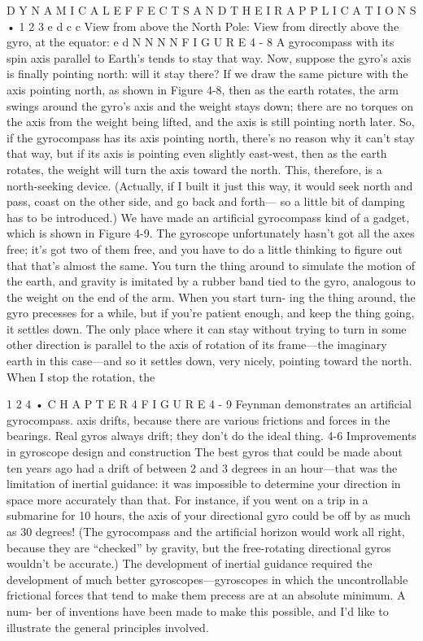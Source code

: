 \documentclass[10pt,oneside]{article}
\begin{document}
D Y N A M I C A L  E F F E C T S  A N D  T H E I R  A P P L I C A T I O N S • 1 2 3 e d c c View from above the North Pole: View from directly above the gyro, at the equator: e d N N N N F I G U R E  4 - 8 A gyrocompass with its spin axis parallel to Earth’s tends to stay that way. Now, suppose the gyro’s axis is finally pointing north: will it stay there? If we draw the same picture with the axis pointing north, as shown in Figure 4-8, then as the earth rotates, the arm swings around the gyro’s axis and the weight stays down; there are no torques on the axis from the weight being lifted, and the axis is still pointing north later. So, if the gyrocompass has its axis pointing north, there’s no reason why it can’t stay that way, but if its axis is pointing even slightly east-west, then as the earth rotates, the weight will turn the axis toward the north. This, therefore, is a north-seeking device. (Actually, if I built it just this way, it would seek north and pass, coast on the other side, and go back and forth--- so a little bit of damping has to be introduced.) We have made an artificial gyrocompass kind of a gadget, which is shown in Figure 4-9. The gyroscope unfortunately hasn’t got all the axes free; it’s got two of them free, and you have to do a little thinking to figure out that that’s almost the same. You turn the thing around to simulate the motion of the earth, and gravity is imitated by a rubber band tied to the gyro, analogous to the weight on the end of the arm. When you start turn- ing the thing around, the gyro precesses for a while, but if you’re patient enough, and keep the thing going, it settles down. The only place where it can stay without trying to turn in some other direction is parallel to the axis of rotation of its frame---the imaginary earth in this case---and so it settles down, very nicely, pointing toward the north. When I stop the rotation, the\par

1 2 4 • C H A P T E R  4 F I G U R E  4 - 9 Feynman demonstrates an artificial gyrocompass. axis drifts, because there are various frictions and forces in the bearings. Real gyros always drift; they don’t do the ideal thing. 4-6 Improvements in gyroscope design and construction The best gyros that could be made about ten years ago had a drift of between 2 and 3 degrees in an hour---that was the limitation of inertial guidance: it was impossible to determine your direction in space more accurately than that. For instance, if you went on a trip in a submarine for 10 hours, the axis of your directional gyro could be off by as much as 30 degrees! (The gyrocompass and the artificial horizon would work all right, because they are “checked” by gravity, but the free-rotating directional gyros wouldn’t be accurate.) The development of inertial guidance required the development of much better gyroscopes---gyroscopes in which the uncontrollable frictional forces that tend to make them precess are at an absolute minimum. A num- ber of inventions have been made to make this possible, and I’d like to illustrate the general principles involved.\par
\end{document}
